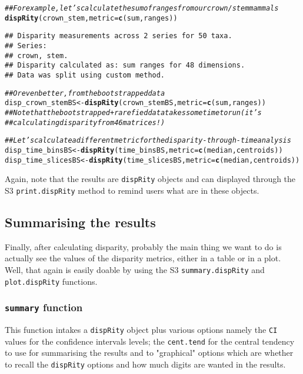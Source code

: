 \documentclass{article}\usepackage[]{graphicx}\usepackage[]{color}
\makeatletter
\newcommand{\hlcom}[1]{\textcolor[rgb]{0.678,0.584,0.686}{\textit{#1}}}%
\newcommand{\hlstd}[1]{\textcolor[rgb]{0.345,0.345,0.345}{#1}}%
\newcommand{\hlkwb}[1]{\textcolor[rgb]{0.69,0.353,0.396}{#1}}%
\newcommand{\hlkwc}[1]{\textcolor[rgb]{0.333,0.667,0.333}{#1}}%
\newcommand{\hlkwd}[1]{\textcolor[rgb]{0.737,0.353,0.396}{\textbf{#1}}}%
\newenvironment{kframe}{%
 \def\at@end@of@kframe{}%
 \ifinner\ifhmode%
  \def\at@end@of@kframe{\end{minipage}}%
  \begin{minipage}{\columnwidth}%
 \fi\fi%
 \def\FrameCommand##1{\hskip\@totalleftmargin \hskip-\fboxsep
 \colorbox{shadecolor}{##1}\hskip-\fboxsep
     \hskip-\linewidth \hskip-\@totalleftmargin \hskip\columnwidth}%
 \MakeFramed {\advance\hsize-\width
   \@totalleftmargin\z@ \linewidth\hsize
   \@setminipage}}%
 {\par\unskip\endMakeFramed%
 \at@end@of@kframe}
\newenvironment{knitrout}{}{} %
\newcommand{\dispRity}{\texttt{dispRity} }
\makeatother
\begin{document}
\begin{knitrout}
\color{fgcolor}\begin{kframe}
\begin{alltt}
\hlcom{## For example, let's calculate the sum of ranges from our crown/stem mammals}
\hlkwd{dispRity}\hlstd{(crown_stem,} \hlkwc{metric} \hlstd{=} \hlkwd{c}\hlstd{(sum, ranges))}
\end{alltt}
\begin{verbatim}
## Disparity measurements across 2 series for 50 taxa. 
## Series:
## crown, stem.
## Disparity calculated as: sum ranges for 48 dimensions.
## Data was split using custom method.
\end{verbatim}
\begin{alltt}
\hlcom{## Or even better, from the bootstrapped data}
\hlstd{disp_crown_stemBS} \hlkwb{<-} \hlkwd{dispRity}\hlstd{(crown_stemBS,} \hlkwc{metric} \hlstd{=} \hlkwd{c}\hlstd{(sum, ranges))}
\hlcom{## Note that the bootstrapped + rarefied data takes some time to run (it's}
\hlcom{## calculating disparity from 46 matrices!)}

\hlcom{## Let's calculate a different metric for the disparity-through-time analysis}
\hlstd{disp_time_binsBS} \hlkwb{<-} \hlkwd{dispRity}\hlstd{(time_binsBS,} \hlkwc{metric} \hlstd{=} \hlkwd{c}\hlstd{(median, centroids))}
\hlstd{disp_time_slicesBS} \hlkwb{<-} \hlkwd{dispRity}\hlstd{(time_slicesBS,} \hlkwc{metric} \hlstd{=} \hlkwd{c}\hlstd{(median, centroids))}
\end{alltt}
\end{kframe}
\end{knitrout}

Again, note that the results are \dispRity objects and can displayed through the S3 \texttt{print.dispRity} method to remind users what are in these objects.

\subsection{Summarising the results}
Finally, after calculating disparity, probably the main thing we want to do is actually see the values of the disparity metrics, either in a table or in a plot.
Well, that again is easily doable by using the S3 \texttt{summary.dispRity} and \texttt{plot.dispRity} functions.

\subsubsection{\texttt{summary} function}
This function intakes a \dispRity object plus various options namely the \texttt{CI} values for the confidence intervals levels; the \texttt{cent.tend} for the central tendency to use for summarising the results and to "graphical" options which are whether to recall the \dispRity options and how much digits are wanted in the results.
\end{document}
